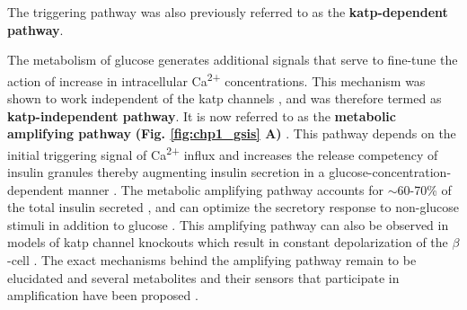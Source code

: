 The triggering pathway was also previously referred to as the \textbf{ \gls{katp}-dependent pathway}.\\

\par The metabolism of glucose generates additional signals that serve to fine-tune the action of increase in intracellular Ca\textsuperscript{2+} concentrations. This mechanism was shown to work independent of the \gls{katp} channels \textbf{\cite{sato_dual_1992,gembal_evidence_1992}}, and was therefore termed as \textbf{\gls{katp}-independent pathway}. It is now referred to as the \textbf{metabolic amplifying pathway} \textbf{(Fig. \ref{fig:chp1_gsis} A)} \textbf{\cite{henquin_triggering_2000,henquin_pathways_2004,henquin_regulation_2009}}.  This pathway depends on the initial triggering signal of Ca\textsuperscript{2+} influx and increases the release competency of insulin granules thereby augmenting insulin secretion in a glucose-concentration-dependent manner \textbf{\cite{henquin_triggering_2000,kalwat_mechanisms_2017}}. The metabolic amplifying pathway accounts for $\sim$60-70\% of the total insulin secreted \textbf{\cite{henquin_regulation_2009}}, and can optimize the secretory response to non-glucose stimuli in addition to glucose \textbf{\cite{henquin_triggering_2000,kalwat_mechanisms_2017,zhao_-hydrolase_2015,tengholm_camp_2017,han_glutamate_2021}}. This amplifying pathway can also be observed in models of \gls{katp} channel knockouts which result in constant depolarization of the $\beta$-cell \textbf{\cite{nenquin_both_2004,miki_defective_1998,ravier_glucose_2009}}. The exact mechanisms behind the amplifying pathway remain to be elucidated and several metabolites and their sensors that participate in amplification have been proposed \textbf{\cite{kalwat_mechanisms_2017}}.%
\\

